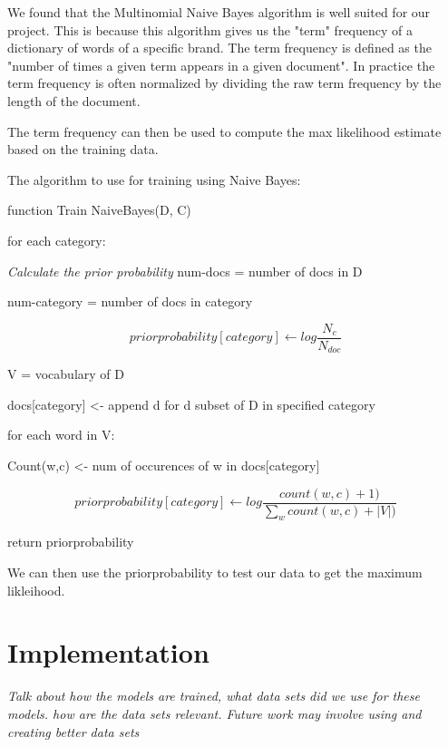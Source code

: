 \documentclass{article}
\begin{document}
We found that the Multinomial Naive Bayes algorithm is well suited for our project. This is because this algorithm gives us the "term" frequency of a dictionary of words of a specific brand.
The term frequency is defined as the "number of times a given term appears in a given document". In practice the term frequency is often normalized by dividing the raw term frequency by the length of the document.

The term frequency can then be used to compute the max likelihood estimate based on the training data.

The algorithm to use for training using Naive Bayes:

function Train NaiveBayes(D, C)

for each category:

\textit{Calculate the prior probability}
num-docs = number of docs in D

num-category = number of docs in category

\[priorprobability[category] \leftarrow log \frac{N_{c}}{N_{doc}}\]

 V = vocabulary of D

 docs[category] <- append d for d subset of D in specified category

 for each word in V:

    Count(w,c) <- num of occurences of w in docs[category]

    \[priorprobability[category] \leftarrow log \frac{count(w,c) +1)}{\sum_{w} count(w,c) + |V|)}\]

return priorprobability

We can then use the priorprobability to test our data to get the maximum likleihood.

\maketitle
\section{Implementation} %
 \textit{Talk about how the models are trained, what data sets did we use for these models. how are the data sets relevant. Future work may involve using and creating better data sets}

 \maketitle
\end{document}
